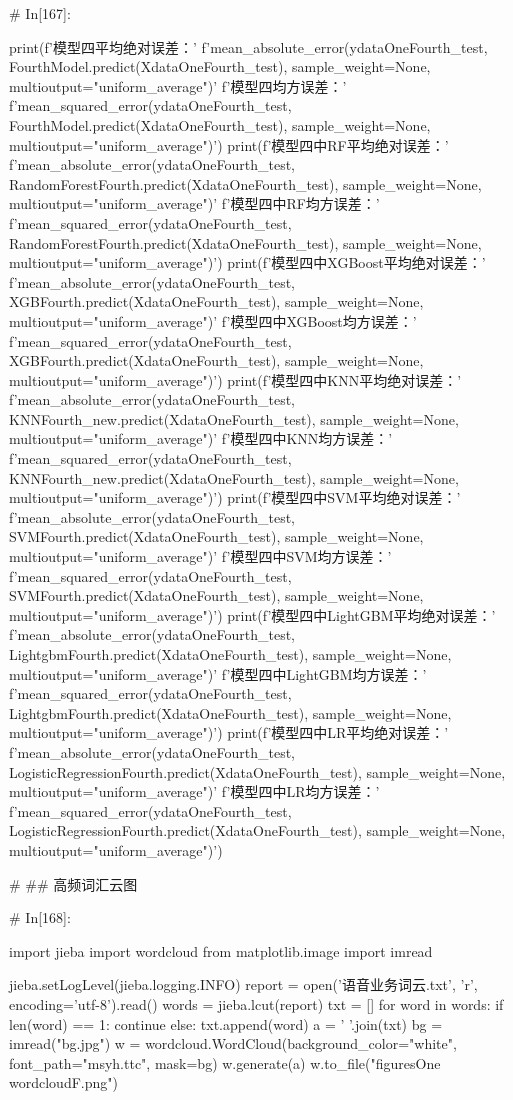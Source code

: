 \documentclass{MathorCupmodeling}
\begin{document}
\begin{python}
	# In[167]:
	
	
	print(f'模型四平均绝对误差：'
		  f'{mean_absolute_error(ydataOneFourth_test, FourthModel.predict(XdataOneFourth_test), sample_weight=None, multioutput="uniform_average")}\n'
		  f'模型四均方误差：'
		  f'{mean_squared_error(ydataOneFourth_test, FourthModel.predict(XdataOneFourth_test), sample_weight=None, multioutput="uniform_average")}')
	print(f'模型四中RF平均绝对误差：'
		  f'{mean_absolute_error(ydataOneFourth_test, RandomForestFourth.predict(XdataOneFourth_test), sample_weight=None, multioutput="uniform_average")}\n'
		  f'模型四中RF均方误差：'
		  f'{mean_squared_error(ydataOneFourth_test, RandomForestFourth.predict(XdataOneFourth_test), sample_weight=None, multioutput="uniform_average")}')
	print(f'模型四中XGBoost平均绝对误差：'
		  f'{mean_absolute_error(ydataOneFourth_test, XGBFourth.predict(XdataOneFourth_test), sample_weight=None, multioutput="uniform_average")}\n'
		  f'模型四中XGBoost均方误差：'
		  f'{mean_squared_error(ydataOneFourth_test, XGBFourth.predict(XdataOneFourth_test), sample_weight=None, multioutput="uniform_average")}')
	print(f'模型四中KNN平均绝对误差：'
		  f'{mean_absolute_error(ydataOneFourth_test, KNNFourth_new.predict(XdataOneFourth_test), sample_weight=None, multioutput="uniform_average")}\n'
		  f'模型四中KNN均方误差：'
		  f'{mean_squared_error(ydataOneFourth_test, KNNFourth_new.predict(XdataOneFourth_test), sample_weight=None, multioutput="uniform_average")}')
	print(f'模型四中SVM平均绝对误差：'
		  f'{mean_absolute_error(ydataOneFourth_test, SVMFourth.predict(XdataOneFourth_test), sample_weight=None, multioutput="uniform_average")}\n'
		  f'模型四中SVM均方误差：'
		  f'{mean_squared_error(ydataOneFourth_test, SVMFourth.predict(XdataOneFourth_test), sample_weight=None, multioutput="uniform_average")}')
	print(f'模型四中LightGBM平均绝对误差：'
		  f'{mean_absolute_error(ydataOneFourth_test, LightgbmFourth.predict(XdataOneFourth_test), sample_weight=None, multioutput="uniform_average")}\n'
		  f'模型四中LightGBM均方误差：'
		  f'{mean_squared_error(ydataOneFourth_test, LightgbmFourth.predict(XdataOneFourth_test), sample_weight=None, multioutput="uniform_average")}')
	print(f'模型四中LR平均绝对误差：'
		  f'{mean_absolute_error(ydataOneFourth_test, LogisticRegressionFourth.predict(XdataOneFourth_test), sample_weight=None, multioutput="uniform_average")}\n'
		  f'模型四中LR均方误差：'
		  f'{mean_squared_error(ydataOneFourth_test, LogisticRegressionFourth.predict(XdataOneFourth_test), sample_weight=None, multioutput="uniform_average")}')
	
	# ## 高频词汇云图
	
	# In[168]:
	
	
	import jieba
	import wordcloud
	from matplotlib.image import imread
	
	jieba.setLogLevel(jieba.logging.INFO)
	report = open('语音业务词云.txt', 'r', encoding='utf-8').read()
	words = jieba.lcut(report)
	txt = []
	for word in words:
		if len(word) == 1:
			continue
		else:
			txt.append(word)
	a = ' '.join(txt)
	bg = imread("bg.jpg")
	w = wordcloud.WordCloud(background_color="white", font_path="msyh.ttc", mask=bg)
	w.generate(a)
	w.to_file("figuresOne\\wordcloudF.png")

\end{python}
\end{document}

